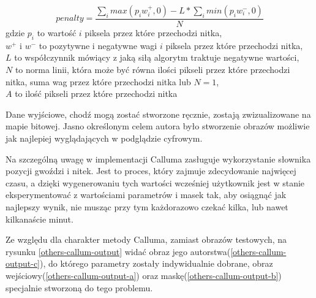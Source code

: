 \documentclass[a4paper, 12pt, polish, twoside]{extreport}
\begin{document}
        \begin{equation} \label{others-callum-penalty}
            penalty = \frac{\sum_{i} max(p_iw_i^+, 0) - L * \sum_{i} min(p_iw_i^-, 0)}{N}
        \end{equation}
        gdzie \(p_i\) to wartość \(i\) piksela przez które przechodzi nitka, \\
        \(w^+\) i \(w^-\) to pozytywne i negatywne wagi \(i\) piksela przez które przechodzi nitka, \\
        \(L\) to współczynnik mówiący z jaką siłą algorytm traktuje negatywne wartości, \\
        \(N\) to norma linii, która może być równa ilości pikseli przez które przechodzi nitka, suma wag przez które przechodzi nitka lub \(N = 1\), \\
        \(A\) to ilość pikseli przez które przechodzi nitka
        
        Dane wyjściowe, chodź mogą zostać stworzone ręcznie, zostają zwizualizowane na mapie bitowej. Jasno określonym celem autora było stworzenie obrazów możliwie jak najlepiej wyglądających w podglądzie cyfrowym. 
        
        Na szczególną uwagę w implementacji Calluma zasługuje wykorzystanie słownika pozycji gwoździ i nitek. Jest to proces, który zajmuje zdecydowanie najwięcej czasu, a dzięki wygenerowaniu tych wartości wcześniej użytkownik jest w stanie eksperymentować z wartościami parametrów i masek tak, aby osiągnąć jak najlepszy wynik, nie musząc przy tym każdorazowo czekać kilka, lub nawet kilkanaście minut. 
        
        Ze względu dla charakter metody Calluma, zamiast obrazów testowych, na rysunku \ref{others-callum-output} widać obraz jego autorstwa(\ref{others-callum-output-c}), do którego parametry zostały indywidualnie dobrane, obraz wejściowy(\ref{others-callum-output-a}) oraz maskę(\ref{others-callum-output-b}) specjalnie stworzoną do tego problemu. 
        
\end{document}
